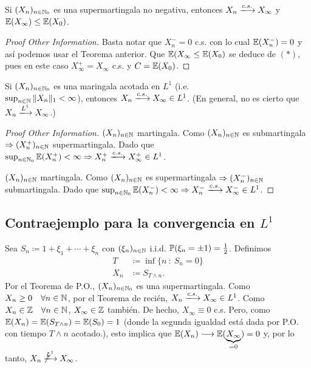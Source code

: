 \begin{corollary}
	Si $(X_{n})_{n \in \mathbb{N}_{0}}$ es una supermartingala no negativa, entonces $X_{n} \xlongrightarrow{c.s.} X_{\infty}$ y $\mathbb{E}(X_{\infty}) \leq \mathbb{E}(X_{0})$.
\end{corollary}
\begin{proof}[Proof Other Information]
	Basta notar que $X_{n}^{-} = 0$ c.s. con lo cual $\mathbb{E}(X_{n}^{-}) = 0$ y así podemos usar el Teorema anterior. Que $\mathbb{E}(X_{\infty} \leq \mathbb{E}(X_{0})$ se deduce de $(*)$, pues en este caso $X_{\infty}^{+} = X_{\infty}$ c.s. y $C = \mathbb{E}(X_{0})$.
\end{proof}

\begin{corollary}
	Si $(X_{n})_{n \in \mathbb{N}_{0}}$ es una maringala acotada en $L^{1}$ (i.e. \\ $\sup_{n \in \mathbb{N}} \| X_{n} \|_{1} < \infty$), entonces $X_{n} \xlongrightarrow{c.s.} X_{\infty} \in L^{1}$. (En general, no es cierto que $X_{n} \xlongrightarrow{L^{1}} X_{\infty}$.)
\end{corollary}
\begin{proof}[Proof Other Information]
	$(X_{n})_{n \in \mathbb{N}}$ martingala. Como $(X_{n})_{n \in \mathbb{N}}$ es submartingala $\Rightarrow (X_{n}^{+})_{n \in \mathbb{N}}$ supermartingala. Dado que $\sup_{n \in \N_{0}} \mbb{E}(X_{n}^{+}) < \infty \implies X_{n}^{+} \xlongrightarrow{c.s.} X_{\infty}^{+} \in L^{1}$. \par
	$(X_{n})_{n \in \mathbb{N}}$ martingala. Como $(X_{n})_{n \in \mathbb{N}}$ es supermartingala $\Rightarrow (X_{n}^{-})_{n \in \mathbb{N}}$ submartingala. Dado que $\sup_{n \in \N_{0}} \mbb{E}(X_{n}^{-}) < \infty \implies X_{n}^{-} \xlongrightarrow{c.s.} X_{\infty}^{-} \in L^{1}$.
\end{proof}

\subsection{Contraejemplo para la convergencia en $L^{1}$}
Sea $S_{n} \coloneq 1 + \xi_{1} + \cdots + \xi_{n}$ con $(\xi_{n})_{n \in \mathbb{N}}$ i.i.d. $\mathbb{P}(\xi_{n} = \pm 1) = \frac{1}{2}$. Definimos
\begin{align*}
	T &\coloneq \inf \{n \ : \ S_{n} = 0\} \\ 
	X_{n} &\coloneq S_{T \wedge n}
.\end{align*}
Por el Teorema de P.O., $(X_{n})_{n \in \mathbb{N}_{0}}$ es una supermartingala. Como $X_{n} \geq 0 \quad \forall n \in \mathbb{N}$, por el Teorema de recién, $X_{n} \xlongrightarrow{c.s.} X_{\infty} \in L^{1}$. Como $X_{n} \in \mathbb{Z} \quad \forall n \in \mathbb{N}$, $X_{\infty} \in \mathbb{Z}$ también. De hecho, $X_{\infty} \equiv 0$ c.s. Pero, como $\mathbb{E}(X_{n}) = \mathbb{E}(S_{T \wedge n}) = \mathbb{E}(S_{0}) = 1$ (donde la segunda igualdad está dada por P.O. con tiempo $T \wedge n$ acotado.), esto implica que $\mathbb{E}(X_{n}) \longrightarrow \mathbb{E}(\underbrace{X_{\infty}}_{=0}) = 0$ y, por lo tanto, $X_{n} \not\xlongrightarrow{L^{1}} X_{\infty}$.

